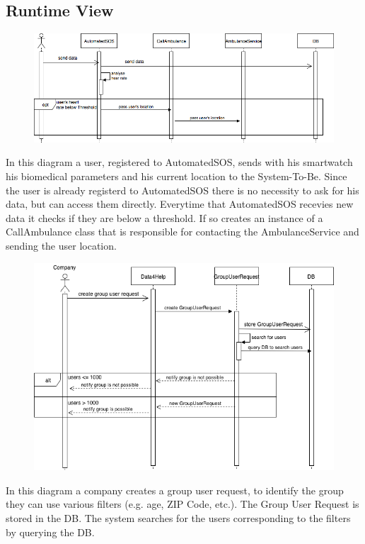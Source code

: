 \documentclass{article}
\begin{document}
\subsection{Runtime View}
\begin{figure}[h!]
\centering
    \textbf{}\par\medskip
	\includegraphics[width= \linewidth]{callambulance.png}
\end{figure}
In this diagram a user, registered to AutomatedSOS, sends with his smartwatch his biomedical parameters and his current location to the System-To-Be. Since the user is already registerd to AutomatedSOS there is no necessity to ask for his data, but can access them directly.\newline
Everytime that AutomatedSOS recevies new data it checks if they are below a threshold. If so creates an instance of a CallAmbulance class that is responsible for contacting the AmbulanceService and sending the user location.
\newpage
\begin{figure}[h!]
\centering
    \textbf{}\par\medskip
	\includegraphics[width= \linewidth]{grouprequest.png}
\end{figure}
In this diagram a company creates a group user request, to identify the group they can use various filters (e.g. age, ZIP Code, etc.). The Group User Request is stored in the DB. The system searches for the users corresponding to the filters by querying the DB.\newline
\end{document}
